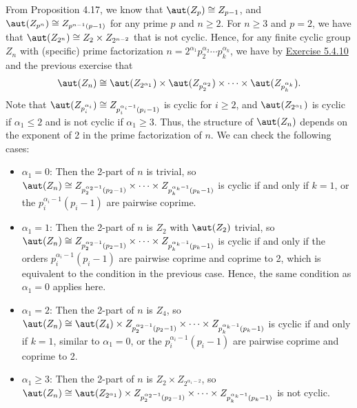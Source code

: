 \begin{sol}
    From Proposition 4.17, we know that $\aut(Z_p) \cong Z_{p - 1}$, and $\aut(Z_{p^n}) \cong Z_{p^{n - 1}(p - 1)}$ for any prime $p$ and $n \geq 2$. For $n \geq 3$ and $p = 2$, we have that $\aut(Z_{2^n}) \cong Z_2 \times Z_{2^{n - 2}}$ that is not cyclic. Hence, for any finite cyclic group $Z_n$ with (specific) prime factorization $n = 2^{\alpha_1} p_2^{\alpha_2} \cdots p_k^{\alpha_k}$, we have by \hyperref[ex5.4.10]{Exercise 5.4.10} and the previous exercise that
    \[\aut(Z_n) \cong \aut(Z_{2^{\alpha_1}}) \times \aut(Z_{p_2^{\alpha_2}}) \times \cdots \times \aut(Z_{p_k^{\alpha_k}}).\]
    Note that $\aut(Z_{p_i^{\alpha_i}}) \cong Z_{p_i^{\alpha_i - 1}(p_i - 1)}$ is cyclic for $i \geq 2$, and $\aut(Z_{2^{\alpha_1}})$ is cyclic if $\alpha_1 \leq 2$ and is not cyclic if $\alpha_1 \geq 3$. Thus, the structure of $\aut(Z_n)$ depends on the exponent of 2 in the prime factorization of $n$. We can check the following cases:
    \begin{itemize}
        \item $\alpha_1 = 0$: Then the 2-part of $n$ is trivial, so $\aut(Z_n) \cong Z_{p_2^{\alpha_2 - 1}(p_2 - 1)} \times \cdots \times Z_{p_k^{\alpha_k - 1}(p_k - 1)}$ is cyclic if and only if $k = 1$, or the $p_i^{\alpha_i - 1}(p_i - 1)$ are pairwise coprime.
        \item $\alpha_1 = 1$: Then the 2-part of $n$ is $Z_2$ with $\aut(Z_2)$ trivial, so $\aut(Z_n) \cong Z_{p_2^{\alpha_2 - 1}(p_2 - 1)} \times \cdots \times Z_{p_k^{\alpha_k - 1}(p_k - 1)}$ is cyclic if and only if the orders $p_i^{\alpha_i - 1}(p_i - 1)$ are pairwise coprime and coprime to 2, which is equivalent to the condition in the previous case. Hence, the same condition as $\alpha_1 = 0$ applies here.
        \item $\alpha_1 = 2$: Then the 2-part of $n$ is $Z_4$, so $\aut(Z_n) \cong \aut(Z_4) \times Z_{p_2^{\alpha_2 - 1}(p_2 - 1)} \times \cdots \times Z_{p_k^{\alpha_k - 1}(p_k - 1)}$ is cyclic if and only if $k = 1$, similar to $\alpha_1 = 0$, or the $p_i^{\alpha_i - 1}(p_i - 1)$ are pairwise coprime and coprime to 2.
        \item $\alpha_1 \geq 3$: Then the 2-part of $n$ is $Z_2 \times Z_{2^{\alpha_1 - 2}}$, so $\aut(Z_n) \cong \aut(Z_{2^{\alpha_1}}) \times Z_{p_2^{\alpha_2 - 1}(p_2 - 1)} \times \cdots \times Z_{p_k^{\alpha_k - 1}(p_k - 1)}$ is not cyclic. \qh
    \end{itemize}
\end{sol}

